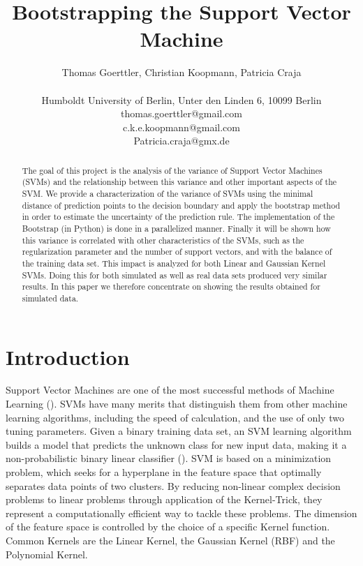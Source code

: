 \documentclass[a4paper]{article}
\title{Bootstrapping the Support Vector Machine}
\author{Thomas Goerttler, Christian Koopmann, Patricia Craja \\
\mbox{}\\
Humboldt University of Berlin, Unter den Linden 6, 10099 Berlin \\
thomas.goerttler@gmail.com\\
c.k.e.koopmann@gmail.com\\
Patricia.craja@gmx.de\\
}
\begin{document}
\maketitle


\begin{abstract}
The goal of this project is the analysis of the variance of Support Vector Machines (SVMs) and the relationship between this variance and other important aspects of the SVM. We provide a characterization of the variance of SVMs using the minimal distance of prediction points to the decision boundary and apply the bootstrap method in order to estimate the uncertainty of the prediction rule. The implementation of the Bootstrap (in Python) is done in a parallelized manner. Finally it will be shown how this variance is correlated with other characteristics of the SVMs, such as the regularization parameter and the number of support vectors, and with the balance of the training data set. This impact is analyzed for both Linear and Gaussian Kernel SVMs. Doing this for both simulated as well as real data sets produced very similar results. In this paper we therefore concentrate on showing the results obtained for simulated data. 
  
\end{abstract}

\section{Introduction}

Support Vector Machines are one of the most successful methods of Machine Learning (\cite{steinwart_support_2008}). SVMs have many merits that distinguish them from other machine learning algorithms, including the speed of calculation, and the use of only two tuning parameters. Given a binary training data set, an SVM learning algorithm builds a model that predicts the unknown class for new input data, making it a non-probabilistic binary linear classifier (\cite{cristianini_introduction_2000}). SVM is based on a minimization problem, which seeks for a hyperplane in the feature space that optimally separates data points of two clusters.  By reducing non-linear complex decision problems to linear problems through application of the Kernel-Trick, they represent a computationally efficient way to tackle these problems. The dimension of the feature space is controlled by the choice of a specific Kernel function. Common Kernels are the Linear Kernel, the Gaussian Kernel (RBF) and the Polynomial Kernel.
\end{document}
